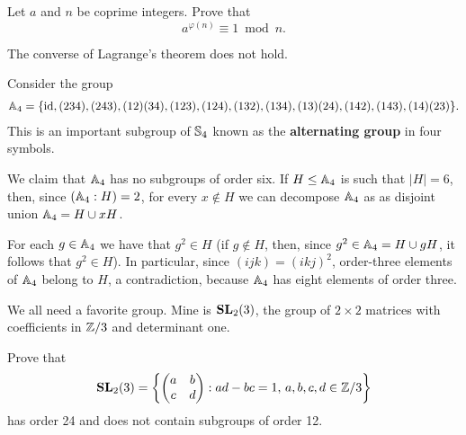 \begin{exercise}
        Let $a$ and $n$ be coprime integers. Prove that 
        \[
        a^{\varphi(n)}\equiv1\bmod n.
        \]
\end{exercise}

The converse of Lagrange's theorem does not hold.   

\begin{example}
\label{exa:A4}
Consider the group 
    \begin{multline*}
\mathbb{A}_4=\{\operatorname{id},(234),(243),(12)(34),(123),(124),(132),(134),(13)(24),(142),(143),(14)(23)\}.
\end{multline*}
This is an important subgroup of $\mathbb{S}_4$ known as the 
\textbf{alternating group} in four symbols. 

We claim that $\mathbb{A}_4$ has no subgroups of order six. If $H\leq\mathbb{A}_4$ is such that 
$|H|=6$, then, since $(\mathbb{A}_4:H)=2$, for every $x\not\in H$ we can decompose $\mathbb{A}_4$ as 
as disjoint union 
$\mathbb{A}_4=H\cup xH$.

For each $g\in\mathbb{A}_4$ we have that $g^2\in H$ (if $g\not\in H$, then, since $g^2\in\mathbb{A}_4=H\cup
gH$, it follows that $g^2\in H$). In particular, since 
$(ijk)=(ikj)^2$, order-three elements of $\mathbb{A}_4$ belong to $H$, a contradiction, 
because $\mathbb{A}_4$ has eight elements of order three. 
\end{example}

We all need a favorite group. Mine is $\mathbf{SL}_2(3)$,
the group of $2\times2$ matrices with coefficients in $\mathbb{Z}/3$
and determinant one. 

\begin{exercise}
Prove that    \[
    \mathbf{SL}_2(3)=\left\{\begin{pmatrix}a&b\\c&d\end{pmatrix}:ad-bc=1,\,a,b,c,d\in\mathbb{Z}/3\right\}
    \]
    has order 24 and does not contain subgroups of order 12.
    \end{exercise}

